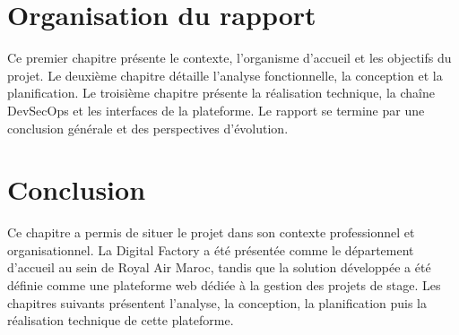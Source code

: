 \section{Organisation du rapport}
Ce premier chapitre présente le contexte, l'organisme d'accueil et les objectifs du projet. Le deuxième chapitre détaille l'analyse fonctionnelle, la conception et la planification. Le troisième chapitre présente la réalisation technique, la chaîne DevSecOps et les interfaces de la plateforme. Le rapport se termine par une conclusion générale et des perspectives d'évolution.

\section{Conclusion}
Ce chapitre a permis de situer le projet dans son contexte professionnel et organisationnel. La Digital Factory a été présentée comme le département d'accueil au sein de Royal Air Maroc, tandis que la solution développée a été définie comme une plateforme web dédiée à la gestion des projets de stage. Les chapitres suivants présentent l'analyse, la conception, la planification puis la réalisation technique de cette plateforme.
